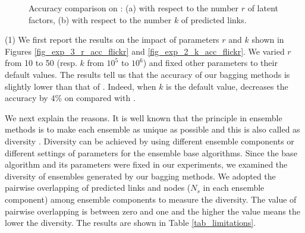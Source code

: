 \begin{figure}[tb!]
  \centering
  \hspace{-2ex}
  \vspace{-1ex}
  \caption{Accuracy comparison on \Flickr: (a) with respect to the number $r$ of latent factors,
  (b) with respect to the number $k$ of predicted links.}\label{fig_exp_5}
  \vspace{-2ex}
\end{figure}

\sstab(1) We first report the results on the impact of parameters $r$ and $k$
shown in Figures \ref{fig_exp_3_r_acc_flickr} and \ref{fig_exp_2_k_acc_flickr}.
We varied $r$ from 10 to 50 (resp. $k$ from $10^5$ to $10^6$)
and fixed other parameters to their default values. The results tell us that
the accuracy of our bagging methods is slightly lower than that of \NMF.
Indeed, when $k$ is the default value, \Biased decreases the accuracy by $4\%$ on \Flickr compared with \NMF.

We next explain the reasons. It is well known that the principle in ensemble methods is to make each ensemble as
unique as possible and this is also called as diversity \cite{zhzhou}. Diversity can
be achieved by using different ensemble components or different settings of parameters for the ensemble base
algorithms. Since the base algorithm and its parameters were fixed in our experiments, we examined
the diversity of ensembles generated by our bagging methods. We adopted the pairwise
overlapping of predicted links and nodes (\ie $N_s$ in each ensemble component)
among ensemble components to measure the diversity. The value of pairwise overlapping is between
zero and one and the higher the value means the lower the diversity.
The results are shown in Table \ref{tab_limitations}.

